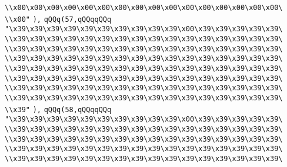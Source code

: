 \verb|\\x00\x00\x00\x00\x00\x00\x00\x00\x00\x00\x00\x00\x00\x00\x00\x00\|\newline
\verb|\\x00"|\newline
\verb|),|\newline
\verb|qQQq(57,qQQqqQQq|\newline
\verb|"\x39\x39\x39\x39\x39\x39\x39\x39\x39\x39\x00\x39\x39\x39\x39\x39\|\newline
\verb|\\x39\x39\x39\x39\x39\x39\x39\x39\x39\x39\x39\x39\x39\x39\x39\x39\|\newline
\verb|\\x39\x39\x39\x39\x39\x39\x39\x39\x39\x39\x39\x39\x39\x39\x39\x39\|\newline
\verb|\\x39\x39\x39\x39\x39\x39\x39\x39\x39\x39\x39\x39\x39\x39\x39\x39\|\newline
\verb|\\x39\x39\x39\x39\x39\x39\x39\x39\x39\x39\x39\x39\x39\x39\x39\x39\|\newline
\verb|\\x39\x39\x39\x39\x39\x39\x39\x39\x39\x39\x39\x39\x39\x39\x39\x39\|\newline
\verb|\\x39\x39\x39\x39\x39\x39\x39\x39\x39\x39\x39\x39\x39\x39\x39\x39\|\newline
\verb|\\x39\x39\x39\x39\x39\x39\x39\x39\x39\x39\x39\x39\x39\x39\x39\x39\|\newline
\verb|\\x39"|\newline
\verb|),|\newline
\verb|qQQq(58,qQQqqQQq|\newline
\verb|"\x39\x39\x39\x39\x39\x39\x39\x39\x39\x39\x00\x39\x39\x39\x39\x39\|\newline
\verb|\\x39\x39\x39\x39\x39\x39\x39\x39\x39\x39\x39\x39\x39\x39\x39\x39\|\newline
\verb|\\x39\x39\x39\x39\x39\x39\x39\x39\x39\x39\x39\x39\x39\x39\x39\x39\|\newline
\verb|\\x39\x39\x39\x39\x39\x39\x39\x39\x39\x39\x39\x39\x39\x39\x39\x39\|\newline
\verb|\\x39\x39\x39\x39\x39\x39\x39\x39\x39\x39\x39\x39\x39\x39\x39\x39\|\newline
